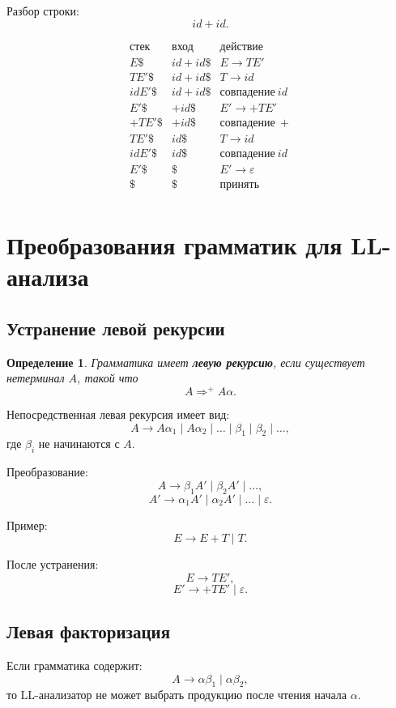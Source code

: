 \documentclass[12pt,a4paper]{article}
\newtheorem{definition}{Определение}
\begin{document}
Разбор строки:
\[
id+id.
\]

\[
\begin{array}{c|c|c}
\text{стек} & \text{вход} & \text{действие}\\
\hline
E\$ & id+id\$ & E\to TE'\\
TE'\$ & id+id\$ & T\to id\\
idE'\$ & id+id\$ & совпадение\ id\\
E'\$ & +id\$ & E'\to +TE'\\
+TE'\$ & +id\$ & совпадение\ +\\
TE'\$ & id\$ & T\to id\\
idE'\$ & id\$ & совпадение\ id\\
E'\$ & \$ & E'\to \varepsilon\\
\$ & \$ & принять\\
\end{array}
\]

\section{Преобразования грамматик для LL-анализа}

\subsection{Устранение левой рекурсии}

\begin{definition}
Грамматика имеет \textbf{левую рекурсию}, если существует нетерминал $A$, такой что
\[
A \Rightarrow^+ A\alpha.
\]
\end{definition}

Непосредственная левая рекурсия имеет вид:
\[
A \to A\alpha_1 \mid A\alpha_2 \mid \ldots \mid \beta_1 \mid \beta_2 \mid \ldots,
\]
где $\beta_i$ не начинаются с $A$.

Преобразование:
\[
A \to \beta_1 A' \mid \beta_2 A' \mid \ldots,
\]
\[
A' \to \alpha_1 A' \mid \alpha_2 A' \mid \ldots \mid \varepsilon.
\]

Пример:
\[
E \to E+T \mid T.
\]

После устранения:
\[
E \to T E',
\]
\[
E' \to +T E' \mid \varepsilon.
\]

\subsection{Левая факторизация}

Если грамматика содержит:
\[
A \to \alpha\beta_1 \mid \alpha\beta_2,
\]
то LL-анализатор не может выбрать продукцию после чтения начала $\alpha$.
\end{document}
